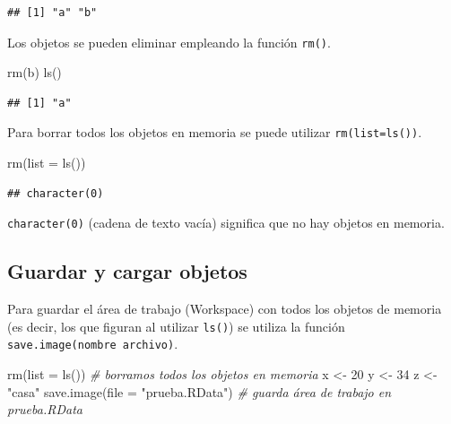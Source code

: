 \documentclass[
]{book}
\newenvironment{Shaded}{\begin{snugshade}}{\end{snugshade}}
\newcommand{\AttributeTok}[1]{\textcolor[rgb]{0.77,0.63,0.00}{#1}}
\newcommand{\CommentTok}[1]{\textcolor[rgb]{0.56,0.35,0.01}{\textit{#1}}}
\newcommand{\DecValTok}[1]{\textcolor[rgb]{0.00,0.00,0.81}{#1}}
\newcommand{\FunctionTok}[1]{\textcolor[rgb]{0.00,0.00,0.00}{#1}}
\newcommand{\NormalTok}[1]{#1}
\newcommand{\OtherTok}[1]{\textcolor[rgb]{0.56,0.35,0.01}{#1}}
\newcommand{\StringTok}[1]{\textcolor[rgb]{0.31,0.60,0.02}{#1}}
\theoremstyle{break}
\theoremstyle{nonumberplain}
\begin{document}
\begin{verbatim}
## [1] "a" "b"
\end{verbatim}

Los objetos se pueden eliminar empleando la función \texttt{rm()}.

\begin{Shaded}
\begin{Highlighting}[]
\FunctionTok{rm}\NormalTok{(b)}
\FunctionTok{ls}\NormalTok{()}
\end{Highlighting}
\end{Shaded}

\begin{verbatim}
## [1] "a"
\end{verbatim}

Para borrar todos los objetos en memoria se puede utilizar \texttt{rm(list=ls())}.

\begin{Shaded}
\begin{Highlighting}[]
\FunctionTok{rm}\NormalTok{(}\AttributeTok{list =} \FunctionTok{ls}\NormalTok{())}
\end{Highlighting}
\end{Shaded}

\begin{verbatim}
## character(0)
\end{verbatim}

\texttt{character(0)} (cadena de texto vacía) significa que no hay objetos en memoria.

\hypertarget{guardar-y-cargar-objetos}{%
\subsection{Guardar y cargar objetos}\label{guardar-y-cargar-objetos}}

Para guardar el área de trabajo (Workspace) con todos los objetos de memoria (es decir, los que figuran al utilizar \texttt{ls()}) se utiliza la función \texttt{save.image(nombre\ archivo)}.

\begin{Shaded}
\begin{Highlighting}[]
\FunctionTok{rm}\NormalTok{(}\AttributeTok{list =} \FunctionTok{ls}\NormalTok{()) }\CommentTok{\# borramos todos los objetos en memoria}
\NormalTok{x }\OtherTok{\textless{}{-}} \DecValTok{20}
\NormalTok{y }\OtherTok{\textless{}{-}} \DecValTok{34}
\NormalTok{z }\OtherTok{\textless{}{-}} \StringTok{"casa"}
\FunctionTok{save.image}\NormalTok{(}\AttributeTok{file =} \StringTok{"prueba.RData"}\NormalTok{) }\CommentTok{\# guarda área de trabajo en prueba.RData}
\end{Highlighting}
\end{Shaded}
\end{document}

